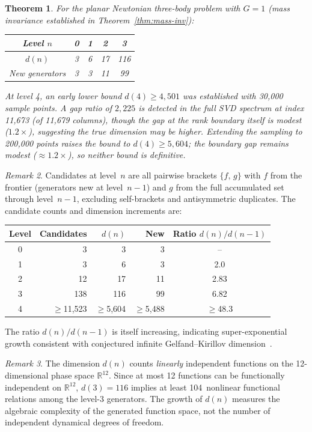 \documentclass[11pt,a4paper]{article}
\newtheorem{theorem}{Theorem}
\theoremstyle{remark}
\newtheorem{remark}[theorem]{Remark}
\newcommand{\pb}[2]{\{#1,\,#2\}}
\newcommand{\R}{\mathbb{R}}
\begin{document}
\begin{theorem}\label{thm:dims}
For the planar Newtonian three-body problem with
$G=1$ (mass invariance established in
Theorem~\ref{thm:mass-inv}):
\begin{center}
\begin{tabular}{@{}ccccc@{}}
\toprule
Level $n$ & 0 & 1 & 2 & 3 \\
\midrule
$d(n)$ & 3 & 6 & 17 & 116 \\
New generators & 3 & 3 & 11 & 99 \\
\bottomrule
\end{tabular}
\end{center}
At level 4, an early lower bound $d(4) \ge 4{,}501$ was
established with 30,000 sample points.  A gap ratio of $2{,}225$
is detected in the full SVD spectrum at index 11,673 (of 11,679
columns), though the gap at the rank boundary itself is modest
($1.2\times$), suggesting the true dimension may be higher.
Extending the sampling to 200,000 points raises the bound to
$d(4) \ge 5{,}604$; the boundary gap remains modest
($\approx 1.2\times$), so neither bound is definitive.
\end{theorem}

\begin{remark}
Candidates at level~$n$ are all pairwise brackets $\pb{f}{g}$
with $f$ from the frontier (generators new at level~$n{-}1$) and
$g$ from the full accumulated set through level~$n{-}1$,
excluding self-brackets and antisymmetric duplicates.  The
candidate counts and dimension increments are:
\begin{center}
\begin{tabular}{@{}crrrc@{}}
\toprule
Level & Candidates & $d(n)$ & New & Ratio $d(n)/d(n{-}1)$ \\
\midrule
0 & 3 & 3 & 3 & -- \\
1 & 3 & 6 & 3 & 2.0 \\
2 & 12 & 17 & 11 & 2.83 \\
3 & 138 & 116 & 99 & 6.82 \\
4 & $\ge$11,523 & $\ge$5,604 & $\ge$5,488 & $\ge$48.3 \\
\bottomrule
\end{tabular}
\end{center}
The ratio $d(n)/d(n{-}1)$ is itself increasing, indicating
super-exponential growth consistent with conjectured infinite
Gelfand--Kirillov dimension~\cite{gelfand-kirillov-1966}.
\end{remark}

\begin{remark}
The dimension $d(n)$ counts \emph{linearly} independent functions
on the 12-dimensional phase space $\R^{12}$.  Since at most 12
functions can be functionally independent on $\R^{12}$,
$d(3) = 116$ implies at least 104~nonlinear functional relations
among the level-3 generators.  The growth of $d(n)$ measures the
algebraic complexity of the generated function space, not the
number of independent dynamical degrees of freedom.
\end{remark}
\end{document}
